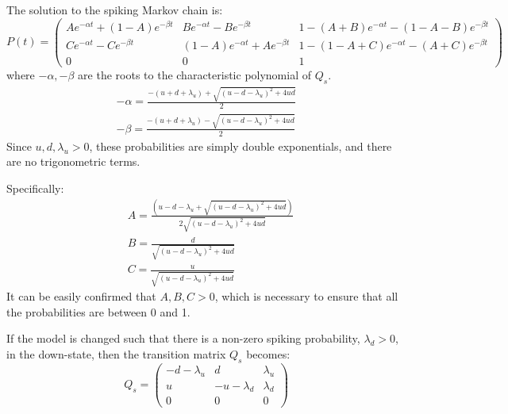 The solution to the spiking Markov chain is:
\begin{equation}
P(t)  = \begin{pmatrix} Ae^{-\alpha t} + (1-A)e^{-\beta t} & Be^{-\alpha t} - Be^{-\beta t} & 1 - (A+B)e^{-\alpha t} - (1-A-B)e^{-\beta t} \\ Ce^{-\alpha t} - Ce^{-\beta t} & (1-A)e^{-\alpha t} +  Ae^{-\beta t} & 1 - (1-A+C)e^{-\alpha t} - (A+C)e^{-\beta t} \\ 0 & 0 & 1 \end{pmatrix}
\end{equation}
where $-\alpha,-\beta$ are the roots to the characteristic polynomial of $Q_s$.
\begin{equation}
\begin{split}
-\alpha = \frac{-(u+d+\lambda_u) + \sqrt{(u-d-\lambda_u)^2 + 4ud}}{2}\\
-\beta = \frac{-(u+d+\lambda_u) - \sqrt{(u-d-\lambda_u)^2 + 4ud}}{2}
\end{split}
\end{equation}
Since $u,d,\lambda_u >0$, these probabilities are simply double exponentials, and there are no trigonometric terms.

Specifically:
\begin{equation}
\begin{split}
&A = \frac{\left(u-d-\lambda_u+\sqrt{(u-d-\lambda_u)^2+4ud}\right)}{2\sqrt{(u-d-\lambda_u)^2+4ud}}\\
&B = \frac{d}{\sqrt{(u-d-\lambda_u)^2+4ud}}\\
&C = \frac{u}{\sqrt{(u-d-\lambda_u)^2+4ud}}
\end{split}
\end{equation}
It can be  easily confirmed that $A,B,C>0$, which is necessary to ensure that all the probabilities are between 0 and 1.

If the model is changed such that there is a non-zero spiking probability, $\lambda_d>0$, in the down-state, then the transition matrix $Q_s$ becomes:
\begin{equation}
Q_s = \begin{pmatrix} -d-\lambda_u & d & \lambda_u \\ u & -u-\lambda_d & \lambda_d \\ 0 & 0 & 0 \end{pmatrix}
\end{equation}

